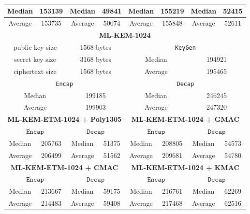 \documentclass[floatrow,journal=tches,submission]{iacrtrans}
\newcommand{\keygen}{\texttt{KeyGen}}
\newcommand{\encap}{\texttt{Encap}}
\newcommand{\decap}{\texttt{Decap}}
\begin{document}
\begin{table}
\begin{tabular}{|c|c|c|c|c|c|c|c|}
        \hline
        Median & 153139 & Median & 49841 & Median & 155219 & Median & 52415 \\
        \hline
        Average & 153735 & Average & 50074 & Average & 155848 & Average & 52611 \\
        \hline\hline
        \multicolumn{8}{|c|}{\bf ML-KEM-1024} \\
        \hline
        \multicolumn{2}{|c|}{public key size} 
        & \multicolumn{2}{|c|}{1568 bytes}
        & \multicolumn{4}{|c|}{ \keygen} \\
        \hline
        \multicolumn{2}{|c|}{secret key size} 
        & \multicolumn{2}{|c|}{3168 bytes} 
        & \multicolumn{2}{|c|}{Median} 
        & \multicolumn{2}{|c|}{194921} \\
        \hline
        \multicolumn{2}{|c|}{ciphertext size} 
        & \multicolumn{2}{|c|}{1568 bytes} 
        & \multicolumn{2}{|c|}{Average} 
        & \multicolumn{2}{|c|}{195465} \\
        \hline
        \multicolumn{4}{|c|}{ \encap}
        & \multicolumn{4}{|c|}{\decap} \\
        \hline
        \multicolumn{2}{|c|}{Median} 
        & \multicolumn{2}{|c|}{199185} 
        & \multicolumn{2}{|c|}{Median} 
        & \multicolumn{2}{|c|}{246245} \\
        \hline
        \multicolumn{2}{|c|}{Average} 
        & \multicolumn{2}{|c|}{199903} 
        & \multicolumn{2}{|c|}{Average} 
        & \multicolumn{2}{|c|}{247320} \\
        \hline
        \multicolumn{4}{|c|}{\bf ML-KEM-ETM-1024 + Poly1305}
        & \multicolumn{4}{|c|}{\bf ML-KEM-ETM-1024 + GMAC} \\
        \hline
        \multicolumn{2}{|c|}{ $\encap$}
        & \multicolumn{2}{|c|}{$\decap$}
        & \multicolumn{2}{|c|}{ $\encap$}
        & \multicolumn{2}{|c|}{$\decap$} \\
        \hline
        Median & 205763 & Median & 51375 
        & Median & 208805 & Median & 54573 \\
        \hline
        Average & 206499 & Average & 51562 
        & Average & 209681 & Average & 54780 \\
        \hline
        \multicolumn{4}{|c|}{\bf ML-KEM-ETM-1024 + CMAC}
        & \multicolumn{4}{|c|}{\bf ML-KEM-ETM-1024 + KMAC} \\
        \hline
        \multicolumn{2}{|c|}{ $\encap$}
        & \multicolumn{2}{|c|}{$\decap$}
        & \multicolumn{2}{|c|}{ $\encap$}
        & \multicolumn{2}{|c|}{$\decap$} \\
        \hline
        Median & 213667 & Median & 59175 & Median & 216761 & Median & 62269 \\
        \hline
        Average & 214483 & Average & 59408 & Average & 217468 & Average & 62516 \\
        \hline\hline
    \end{tabular}
\end{table}
\end{document}
